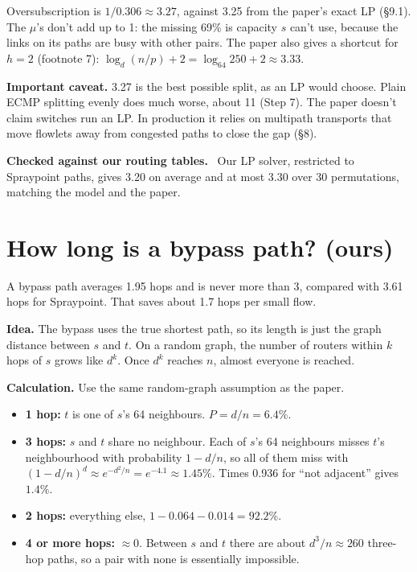 \documentclass[11pt]{article}
\newenvironment{checked}
  {\par\smallskip\noindent\begin{lrbox}{\checkedbox}%
   \begin{minipage}{\dimexpr\linewidth-2\fboxsep\relax}%
   \textbf{Checked against our routing tables.}\ }
  {\end{minipage}\end{lrbox}\colorbox{black!5}{\usebox{\checkedbox}}\par\smallskip}
\begin{document}
Oversubscription is $1 / 0.306 \approx \mathbf{3.27}$, against 3.25 from the paper's exact LP (§9.1). The $\mu$'s don't add up to 1: the missing 69\% is capacity $s$ can't use, because the links on its paths are busy with other pairs. The paper also gives a shortcut for $h = 2$ (footnote 7): $\log_d(n/p) + 2 = \log_{64} 250 + 2 \approx 3.33$.

\textbf{Important caveat.} 3.27 is the best possible split, as an LP would choose. Plain ECMP splitting evenly does much worse, about 11 (Step 7). The paper doesn't claim switches run an LP. In production it relies on multipath transports that move flowlets away from congested paths to close the gap (§8).

\begin{checked}
Our LP solver, restricted to Spraypoint paths, gives 3.20 on average and at most 3.30 over 30 permutations, matching the model and the paper.
\end{checked}

\section{How long is a bypass path? (ours)}

A bypass path averages 1.95 hops and is never more than 3, compared with 3.61 hops for Spraypoint. That saves about 1.7 hops per small flow.

\textbf{Idea.} The bypass uses the true shortest path, so its length is just the graph distance between $s$ and $t$. On a random graph, the number of routers within $k$ hops of $s$ grows like $d^k$. Once $d^k$ reaches $n$, almost everyone is reached.

\textbf{Calculation.} Use the same random-graph assumption as the paper.
\begin{itemize}
  \item \textbf{1 hop:} $t$ is one of $s$'s 64 neighbours. $P = d/n = 6.4\%$.
  \item \textbf{3 hops:} $s$ and $t$ share no neighbour. Each of $s$'s 64 neighbours misses $t$'s neighbourhood with probability $1 - d/n$, so all of them miss with $(1 - d/n)^d \approx e^{-d^2/n} = e^{-4.1} \approx 1.45\%$. Times 0.936 for ``not adjacent'' gives $1.4\%$.
  \item \textbf{2 hops:} everything else, $1 - 0.064 - 0.014 = 92.2\%$.
  \item \textbf{4 or more hops:} $\approx 0$. Between $s$ and $t$ there are about $d^3/n \approx 260$ three-hop paths, so a pair with none is essentially impossible.
\end{itemize}
\end{document}
